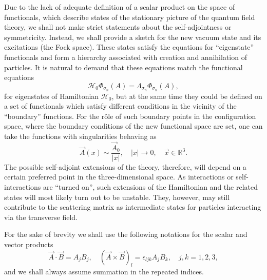 \documentclass[12pt]{article}
\newcommand{\HH}{\mathscr{H}}
\newcommand{\RR}{\mathbb{R}}
\begin{document}
    Due to the lack of adequate definition of a scalar product on the space
    of functionals, which describe states of the stationary picture of the
    quantum field theory, we shall not make strict statements about the
    self-adjointness or symmetricity.
    Instead, we shall provide a sketch for the new vacuum state and its
    excitations (the Fock space).
    These states satisfy the equations for ``eigenstate'' functionals and
	form a hierarchy associated with creation and annihilation of particles.
	It is natural to demand that these equations match
	the functional equations
\begin{equation*}
    \HH_{0} \Phi_{\sigma_{n}}(A) = \Lambda_{\sigma_{n}} \Phi_{\sigma_{n}}(A) ,
\end{equation*}
	for eigenstates of Hamiltonian
$ \HH_{0} $,
	but at the same time they could be defined on a set of functionals
	which satisfy different conditions in the vicinity of the ``boundary''
    functions.
	For the r\^ole of such boundary points in the configuration space,
	where the boundary conditions of the new functional space are set,
	one can take the functions with singularities behaving as
\begin{equation}
\label{Asing}
    \vec{A}(x) \sim \frac{\vec{A}_{0}}{|x|}, \quad |x| \to 0 ,
	\quad \vec{x} \in \RR^{3} .
\end{equation}
	The possible self-adjoint extensions of the theory, therefore,
    will depend on a
	certain preferred point in the three-dimensional space.
	As interactions or self-interactions are ``turned on'',
	such extensions of the Hamiltonian and the related states will most
	likely turn out to be unstable.
	They, however, may still contribute to the scattering matrix as
	intermediate states for particles interacting via the transverse field.

    For the sake of brevity we shall use
    the following notations for the scalar and vector products
\begin{equation*}
    \vec{A}\cdot\vec{B} = A_{j}B_{j} ,\quad
	(\vec{A}\times\vec{B})_{l} = \epsilon_{ljk} A_{j} B_{k} ,
    \quad j,k= 1,2,3,
\end{equation*}
    and we shall always assume summation in the repeated indices.

\end{document}

